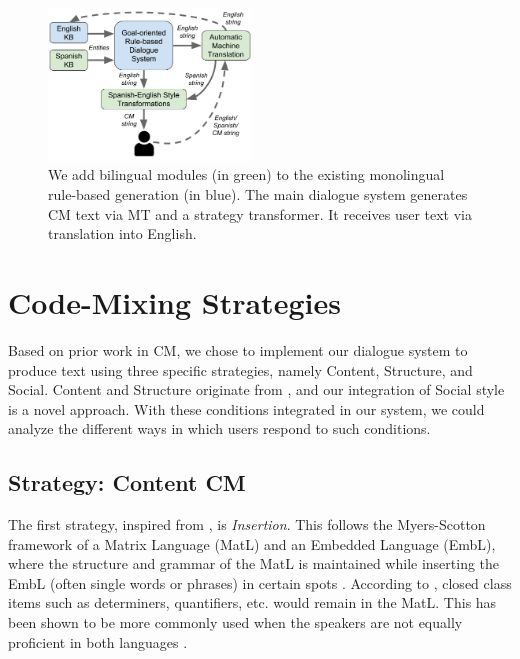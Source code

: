 \documentclass[11pt,a4paper]{article}
\begin{document}
\begin{figure}
	\includegraphics[width=0.48\textwidth]{img/all_system_1031}
	\centering
  	\caption{We add bilingual modules (in green) to the existing monolingual rule-based generation (in blue). The main dialogue system generates CM text via MT and a strategy transformer. It receives user text via translation into English.}
    \label{fig:sys-diagram}
\end{figure}


\section{Code-Mixing Strategies}
\label{sec:strategies}
Based on prior work in CM, we chose to implement our dialogue system to produce text using three specific strategies, namely Content, Structure, and Social. 
Content and Structure originate from \citet{muysken2000bilingual}, and our integration of Social style is a novel approach.
With these conditions integrated in our system, we could analyze the different ways in which users respond to such conditions.

\subsection{Strategy: Content CM}

The first strategy, inspired from \citet{muysken2000bilingual}, is \textit{Insertion}.
This follows the Myers-Scotton framework of a Matrix Language (MatL) and an Embedded Language (EmbL), where the structure and grammar of the MatL is maintained while inserting the EmbL (often single words or phrases) in certain spots \citep{myers1993common}. 
According to \citet{Joshi1982}, closed class items such as determiners, quantifiers, etc. would remain in the MatL.
This has been shown to be more commonly used when the speakers are not equally proficient in both languages \citep{Deuchar2007}. 
\end{document}
